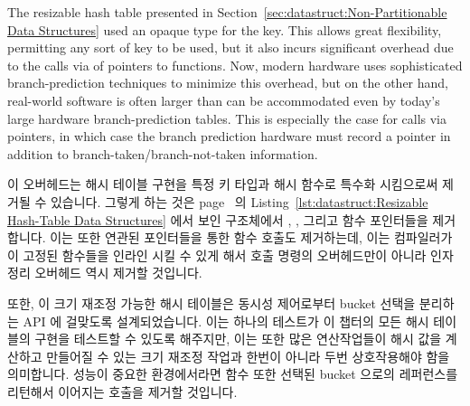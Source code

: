 The resizable hash table presented in
Section~\ref{sec:datastruct:Non-Partitionable Data Structures}
used an opaque type for the key.
This allows great flexibility, permitting any sort of key to be
used, but it also incurs significant overhead due to the calls via
of pointers to functions.
Now, modern hardware uses sophisticated branch-prediction techniques
to minimize this overhead, but on the other hand, real-world software
is often larger than can be accommodated even by today's large
hardware branch-prediction tables.
This is especially the case for calls via pointers, in which case
the branch prediction hardware must record a pointer in addition
to branch-taken/branch-not-taken information.
\fi

이 오버헤드는 해시 테이블 구현을 특정 키 타입과 해시 함수로 특수화 시킴으로써
제거될 수 있습니다.
그렇게 하는 것은
page~\pageref{lst:datastruct:Resizable Hash-Table Data Structures} 의
Listing~\ref{lst:datastruct:Resizable Hash-Table Data Structures} 에서 보인
 구조체에서 , , 그리고
 함수 포인터들을 제거합니다.
이는 또한 연관된 포인터들을 통한 함수 호출도 제거하는데, 이는 컴파일러가 이
고정된 함수들을 인라인 시킬 수 있게 해서 호출 명령의 오버헤드만이 아니라 인자
정리 오버헤드 역시 제거할 것입니다.

또한, 이 크기 재조정 가능한 해시 테이블은 동시성 제어로부터 bucket 선택을
분리하는 API 에 걸맞도록 설계되었습니다.
이는 하나의 테스트가 이 챕터의 모든 해시 테이블의 구현을 테스트할 수 있도록
해주지만, 이는 또한 많은 연산작업들이 해시 값을 계산하고 만들어질 수 있는 크기
재조정 작업과 한번이 아니라 두번 상호작용해야 함을 의미합니다.
성능이 중요한 환경에서라면  함수 또한 선택된 bucket
으로의 레퍼런스를 리턴해서 이어지는  호출을 제거할
것입니다.


